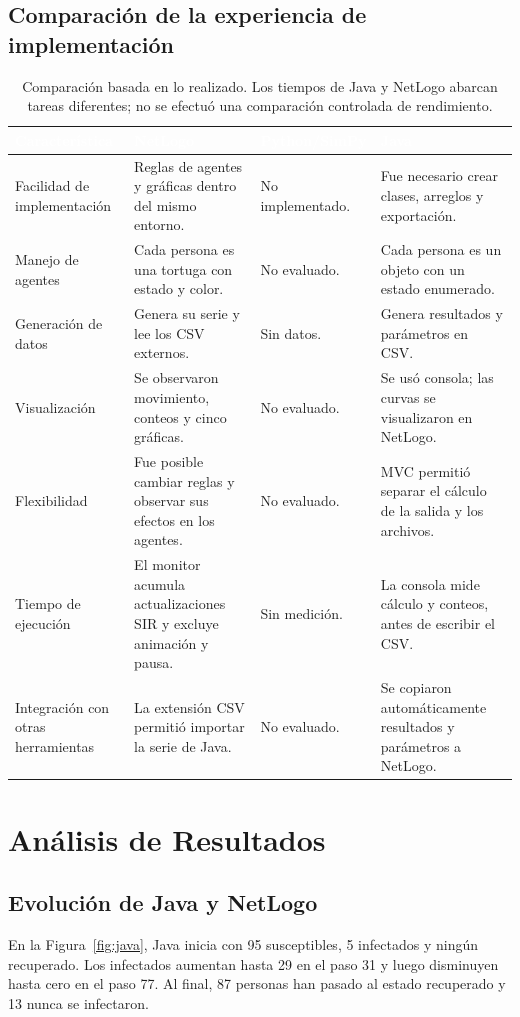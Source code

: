 \documentclass[11pt,a4paper]{article}
\renewcommand{\arraystretch}{1.08}
\newcommand{\cab}[1]{\textbf{\textcolor{white}{#1}}}
\newcommand{\tabestilo}{\arrayrulecolor{borderblue}\setlength{\arrayrulewidth}{0.75pt}\renewcommand{\arraystretch}{1.2}}
\begin{document}
\subsection{Comparación de la experiencia de implementación}
\begin{table}[H]
\centering\tabestilo\footnotesize
\setlength{\tabcolsep}{4pt}
\begin{tabularx}{\textwidth}{|L{0.19\textwidth}|Y|L{0.15\textwidth}|Y|}
\hline{}\cab{Característica} & \cab{NetLogo} & \cab{Python/SimPy} & \cab{Java} \\ \hline
Facilidad de implementación & Reglas de agentes y gráficas dentro del mismo entorno. & No implementado. & Fue necesario crear clases, arreglos y exportación. \\ \hline
{}Manejo de agentes & Cada persona es una tortuga con estado y color. & No evaluado. & Cada persona es un objeto con un estado enumerado. \\ \hline
Generación de datos & Genera su serie y lee los CSV externos. & Sin datos. & Genera resultados y parámetros en CSV. \\ \hline
{}Visualización & Se observaron movimiento, conteos y cinco gráficas. & No evaluado. & Se usó consola; las curvas se visualizaron en NetLogo. \\ \hline
Flexibilidad & Fue posible cambiar reglas y observar sus efectos en los agentes. & No evaluado. & MVC permitió separar el cálculo de la salida y los archivos. \\ \hline
{}Tiempo de ejecución & El monitor acumula actualizaciones SIR y excluye animación y pausa. & Sin medición. & La consola mide cálculo y conteos, antes de escribir el CSV. \\ \hline
Integración con otras herramientas & La extensión CSV permitió importar la serie de Java. & No evaluado. & Se copiaron automáticamente resultados y parámetros a NetLogo. \\ \hline
\end{tabularx}
\caption{Comparación basada en lo realizado. Los tiempos de Java y NetLogo abarcan tareas diferentes; no se efectuó una comparación controlada de rendimiento.}
\label{tab:experiencia}
\end{table}
\FloatBarrier

\section{Análisis de Resultados}
\subsection{Evolución de Java y NetLogo}
En la Figura~\ref{fig:java}, Java inicia con 95 susceptibles, 5 infectados y ningún recuperado. Los infectados aumentan hasta 29 en el paso 31 y luego disminuyen hasta cero en el paso 77. Al final, 87 personas han pasado al estado recuperado y 13 nunca se infectaron.
\end{document}
